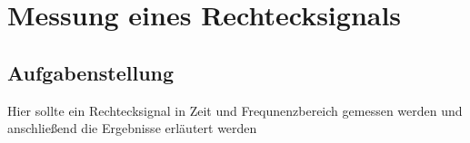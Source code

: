 \section{Messung eines Rechtecksignals}
\subsection{Aufgabenstellung}
Hier sollte ein Rechtecksignal in Zeit und Frequnenzbereich gemessen werden und anschlie\ss{}end die Ergebnisse erl\"autert werden
